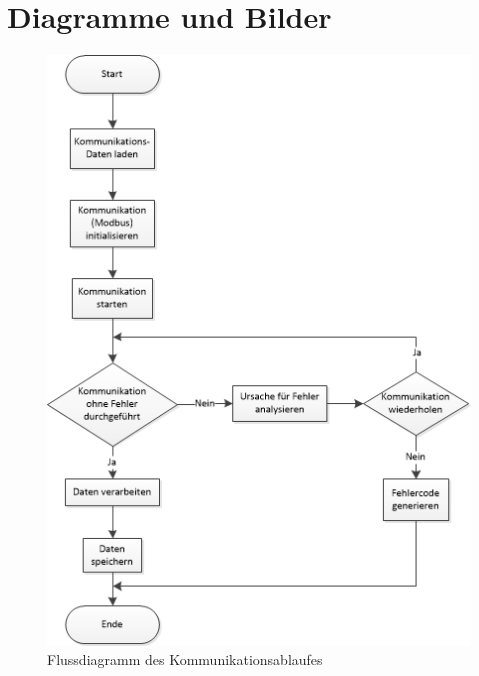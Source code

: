 \documentclass[Bachelorarbeit.tex]{subfiles}
\begin{document}
\chapter{Diagramme und Bilder}
\label{doc:anhang_a}
\begin{figure}
\includegraphics[width=1\textwidth]{./img/Flussdiagramm.png}
\caption{Flussdiagramm des Kommunikationsablaufes}
\label{pic:flussdiagramm_kommunikation}
\end{figure}
\newpage
\end{document}
